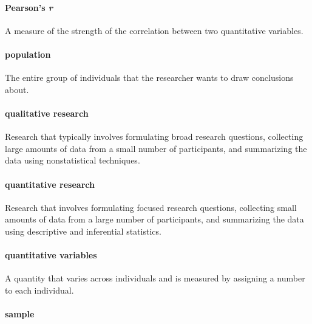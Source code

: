 \documentclass[
]{krantz}
\begin{document}
\paragraph*{\texorpdfstring{Pearson's \emph{r}}{Pearson's r}}\label{pearsons-r}

A measure of the strength of the correlation between two quantitative variables.

\paragraph*{population}\label{population}

The entire group of individuals that the researcher wants to draw conclusions about.

\paragraph*{qualitative research}\label{qualitative-research}

Research that typically involves formulating broad research questions, collecting large amounts of data from a small number of participants, and summarizing the data using nonstatistical techniques.

\paragraph*{quantitative research}\label{quantitative-research}

Research that involves formulating focused research questions, collecting small amounts of data from a large number of participants, and summarizing the data using descriptive and inferential statistics.

\paragraph*{quantitative variables}\label{quantitative-variables}

A quantity that varies across individuals and is measured by assigning a number to each individual.

\paragraph*{sample}\label{sample}
\end{document}
